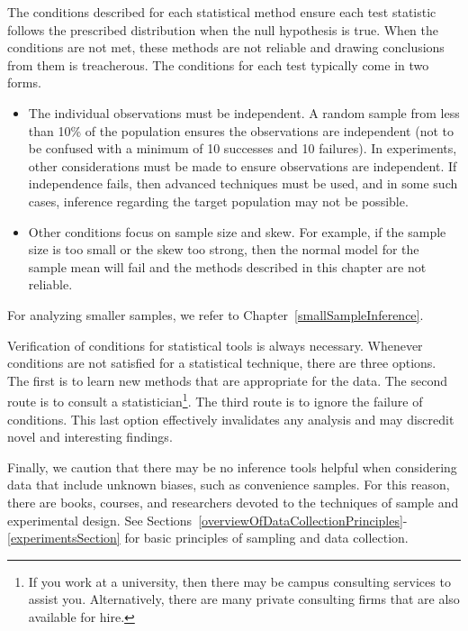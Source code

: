The conditions described for each statistical method ensure each test statistic follows the prescribed distribution when the null hypothesis is true. When the conditions are not met, these methods are not reliable and drawing conclusions from them is treacherous. The conditions for each test typically come in two forms.
\begin{itemize}
\setlength{\itemsep}{0mm}
\item The individual observations must be independent. A random sample from less than 10\% of the population ensures the observations are independent (not to be confused with a minimum of 10 successes and 10 failures). In experiments, other considerations must be made to ensure observations are independent. If independence fails, then advanced techniques must be used, and in some such cases, inference regarding the target population may not be possible.
\item Other conditions focus on sample size and skew. For example, if the sample size is too small or the skew too strong, then the normal model for the sample mean will fail and the methods described in this chapter are not reliable.
\end{itemize}
For analyzing smaller samples, we refer to Chapter~\ref{smallSampleInference}.%

Verification of conditions for statistical tools is always necessary. Whenever conditions are not satisfied for a statistical technique, there are three options. The first is to learn new methods that are appropriate for the data. The second route is to consult a statistician\footnote{If you work at a university, then there may be campus consulting services to assist you. Alternatively, there are many private consulting firms that are also available for hire.}. The third route is to ignore the failure of conditions. This last option effectively invalidates any analysis and may discredit novel and interesting findings.

Finally, we caution that there may be no inference tools helpful when considering data that include unknown biases, such as convenience samples. For this reason, there are books, courses, and researchers devoted to the techniques of sample and experimental design. See Sections~\ref{overviewOfDataCollectionPrinciples}-\ref{experimentsSection} for basic principles of sampling and data collection.



